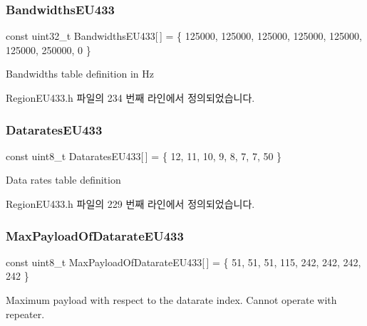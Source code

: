 \subsubsection{\texorpdfstring{Bandwidths\+E\+U433}{BandwidthsEU433}}
{\footnotesize\ttfamily const uint32\+\_\+t Bandwidths\+E\+U433\mbox{[}$\,$\mbox{]} = \{ 125000, 125000, 125000, 125000, 125000, 125000, 250000, 0 \}\hspace{0.3cm}{\ttfamily [static]}}

Bandwidths table definition in Hz 

Region\+E\+U433.\+h 파일의 234 번째 라인에서 정의되었습니다.

\mbox{\label{group___r_e_g_i_o_n_e_u433_ga5e9c57bd445d1ba91941c381ef4104c9}} 
\subsubsection{\texorpdfstring{Datarates\+E\+U433}{DataratesEU433}}
{\footnotesize\ttfamily const uint8\+\_\+t Datarates\+E\+U433\mbox{[}$\,$\mbox{]} = \{ 12, 11, 10, 9, 8, 7, 7, 50 \}\hspace{0.3cm}{\ttfamily [static]}}

Data rates table definition 

Region\+E\+U433.\+h 파일의 229 번째 라인에서 정의되었습니다.

\mbox{\label{group___r_e_g_i_o_n_e_u433_gabab90fd75889d31cdde596e5991126aa}} 
\subsubsection{\texorpdfstring{Max\+Payload\+Of\+Datarate\+E\+U433}{MaxPayloadOfDatarateEU433}}
{\footnotesize\ttfamily const uint8\+\_\+t Max\+Payload\+Of\+Datarate\+E\+U433\mbox{[}$\,$\mbox{]} = \{ 51, 51, 51, 115, 242, 242, 242, 242 \}\hspace{0.3cm}{\ttfamily [static]}}

Maximum payload with respect to the datarate index. Cannot operate with repeater. 

